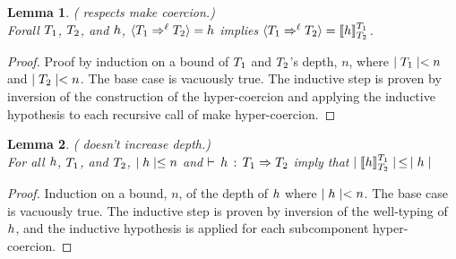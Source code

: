 \documentclass[acmtog, authorversion, acmlarge]{acmart}
\newtheorem{lem}{Lemma}
\begin{document}
\begin{lem}
  \label{lem:iso_mk}
  ( respects make coercion.)\\
  Forall $\T_1$, $\T_2$, and $\HC$, 
  $\mkcrcn{\T_1}{\T_2} = \HC$ implies
  $\mkcrcn{\T_1}{\T_2} = \interp{\HC}{\T_1}{\T_2}$.
\end{lem}
\begin{proof}
  Proof by induction on a bound of $\T_1$ and $\T_2$'s depth, $n$,
  where $\depth{\T_1} < n$ and $\depth{\T_2} < n$.
  The base case is vacuously true.
  The inductive step is proven by inversion of the construction
  of the hyper-coercion and applying the inductive hypothesis
  to each recursive call of make hyper-coercion. 
\end{proof}

\begin{lem}
  \label{lem:iso_bound}
  ( doesn't increase depth.)\\
  For all $\HC$, $\T_1$, and $\T_2$,
  $\depth{\HC} \le n$ and
  $\cwt{\HC}{\T_1}{\T_2}$
  imply that
  $\depth{\interp{\HC}{\T_1}{\T_2}} \, \le \, \depth{\HC}$
\end{lem}%
\begin{proof}
  Induction on a bound, $n$, of the depth of $\HC$ where
  $\depth{\HC} < n$.
  The base case is vacuously true.
  The inductive step is proven by inversion of the well-typing
  of $\HC$, and the inductive hypothesis
  is applied for each subcomponent hyper-coercion. 
\end{proof}
\end{document}
